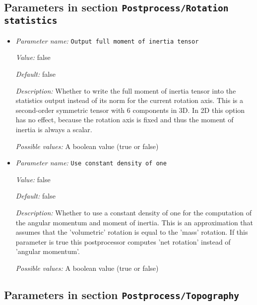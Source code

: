 \subsection{Parameters in section \tt Postprocess/Rotation statistics}
\label{parameters:Postprocess/Rotation_20statistics}

\begin{itemize}
\item {\it Parameter name:} {\tt Output full moment of inertia tensor}
\label{parameters:Postprocess/Rotation statistics/Output full moment of inertia tensor}
\label{parameters:Postprocess/Rotation_20statistics/Output_20full_20moment_20of_20inertia_20tensor}


{\it Value:} false


{\it Default:} false


{\it Description:} Whether to write the full moment of inertia tensor into the statistics output instead of its norm for the current rotation axis. This is a second-order symmetric tensor with 6 components in 3D. In 2D this option has no effect, because the rotation axis is fixed and thus the moment of inertia is always a scalar.


{\it Possible values:} A boolean value (true or false)
\item {\it Parameter name:} {\tt Use constant density of one}
\label{parameters:Postprocess/Rotation statistics/Use constant density of one}
\label{parameters:Postprocess/Rotation_20statistics/Use_20constant_20density_20of_20one}


{\it Value:} false


{\it Default:} false


{\it Description:} Whether to use a constant density of one for the computation of the angular momentum and moment of inertia. This is an approximation that assumes that the 'volumetric' rotation is equal to the 'mass' rotation. If this parameter is true this postprocessor computes 'net rotation' instead of 'angular momentum'.


{\it Possible values:} A boolean value (true or false)
\end{itemize}

\subsection{Parameters in section \tt Postprocess/Topography}
\label{parameters:Postprocess/Topography}

